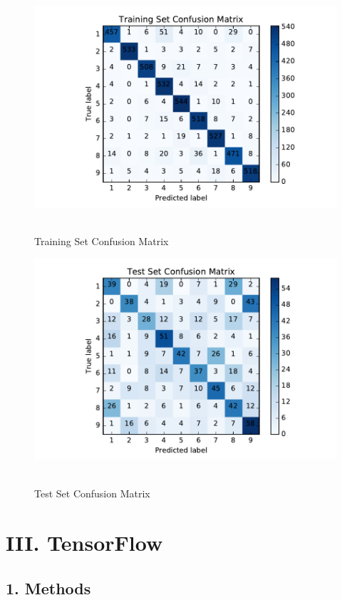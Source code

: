 \begin{figure}[H]
\centering
\includegraphics[width=1.0\textwidth]{./figures/trainMatrix.pdf}\
\caption{\label{fig:trainMatrix} Training Set Confusion Matrix}
\end{figure}


\begin{figure}[H]
\centering
\includegraphics[width=1.0\textwidth]{./figures/testMatrix.pdf}\
\caption{\label{fig:testMatrix} Test Set Confusion Matrix}
\end{figure}


\newpage
\section*{\Large III. TensorFlow}

\subsection*{\large 1. Methods}

